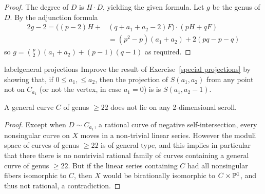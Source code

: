 \begin{proof} The degree of $D$ is $H\cdot D$, yielding the given formula. Let $g$ be the genus of $D$. 
By the adjunction formula
\begin{align*}
2g-2 =  \bigl((p-2)H+&(q+a_{1}+a_{2}-2)F\bigr)\cdot (pH+qF)\\ 
 &= (p^{2}-p)(a_{1}+a_{2})+2(pq-p-q)
\end{align*}
so $g = {p\choose 2}(a_{1}+a_{2}) + (p-1)(q-1)$ as required.
\end{proof}

\begin{exercise}label{general projections}
Improve the result of Exercise~\ref{special projections} by showing that, if $0\leq a_1,\leq a_2$, then
 the projection of $S(a_1,a_2)$ from any point not on $C_{a_1}$ (or not the vertex, in case $a_1=0$) is 
 is $S(a_1, a_2-1)$.
\end{exercise}
\begin{fact}
A general curve $C$ of  genus $\geq 22$ does not lie on any 2-dimensional scroll.
\end{fact}
\begin{proof}
Except when $D\sim C_{a_{1}}$, a rational curve of negative self-intersection, every nonsingular curve on $X$ moves in a non-trivial linear series. However the moduli space of curves of genus $\geq 22$ is of general type, and this implies in particular that there there is no nontrivial rational family of curves containing a general curve of 
genus $\geq 22$. But if the linear series containing $C$ had all nonsingular fibers isomorphic to $C$, then
$X$ would be birationally isomorphic to $C\times {\mathbb P}^{1}$, and thus not rational, a contradiction.
\end{proof}


